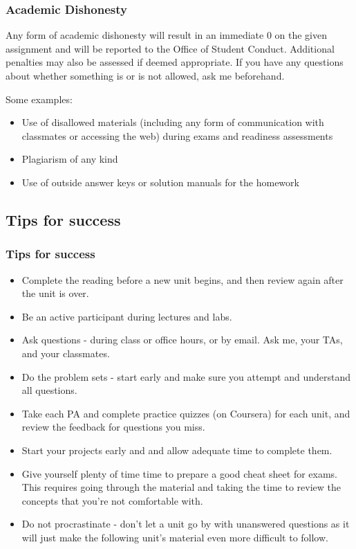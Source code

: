 \documentclass[11pt,containsverbatim,handout,xcolor=xelatex,dvipsnames,table]{beamer}
\begin{document}
\begin{frame}
\frametitle{Academic Dishonesty}

Any form of academic dishonesty will result in an immediate 0 on the given assignment 
and will be reported to the Office of Student Conduct. Additional penalties may also 
be assessed if deemed appropriate. If you have any questions about whether something 
is or is not allowed, ask me beforehand.

Some examples:

\begin{itemize}

\item Use of disallowed materials (including any form of communication with classmates 
or accessing the web) during exams and readiness assessments

\item Plagiarism of any kind

\item Use of outside answer keys or solution manuals for the homework

\end{itemize}

\end{frame}


\subsection{Tips for success}


\begin{frame}
\frametitle{Tips for success}

{\footnotesize
\begin{itemize}[<alert@+>]
\item Complete the reading before a new unit begins, and then review again after the 
unit is over.
\item Be an active participant during lectures and labs.
\item Ask questions - during class or office hours, or by email. Ask me, your TAs, and 
your classmates.
\item Do the problem sets - start early and make sure you attempt and understand all 
questions.
\item Take each PA and complete practice quizzes (on Coursera) for each unit, and
review the feedback for questions you miss.
\item Start your projects early and and allow adequate time to complete them.
\item Give yourself plenty of time time to prepare a good cheat sheet for exams. This 
requires going through the material and taking the time to review the concepts that 
you're not comfortable with.
\item Do not procrastinate - don't let a unit go by with unanswered questions as it 
will just make the following unit's material even more difficult to follow. 
\end{itemize}
}

\end{frame}
\end{document}
